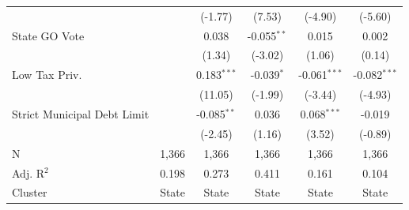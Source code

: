 \begin{tabular*}{\textwidth}{@{\extracolsep{\fill}}lccccc}
                               &                & (-1.77)       & (7.53)       & (-4.90)       & (-5.60)\\   
   State GO Vote               &                & 0.038          & -0.055$^{**}$ & 0.015          & 0.002\\   
                               &                & (1.34)        & (-3.02)      & (1.06)        & (0.14)\\   
   Low Tax Priv.               &                & 0.183$^{***}$  & -0.039$^{*}$  & -0.061$^{***}$ & -0.082$^{***}$\\   
                               &                & (11.05)       & (-1.99)      & (-3.44)       & (-4.93)\\   
   Strict Municipal Debt Limit &                & -0.085$^{**}$  & 0.036         & 0.068$^{***}$  & -0.019\\   
                               &                & (-2.45)       & (1.16)       & (3.52)        & (-0.89)\\   
   \hline
   N                & 1,366          & 1,366          & 1,366         & 1,366          & 1,366\\  
   Adj. R$^2$              & 0.198          & 0.273          & 0.411         & 0.161          & 0.104\\  
   Cluster              & State & State & State & State & State\\  
   \bottomrule
\end{tabular*}
\par\endgroup
